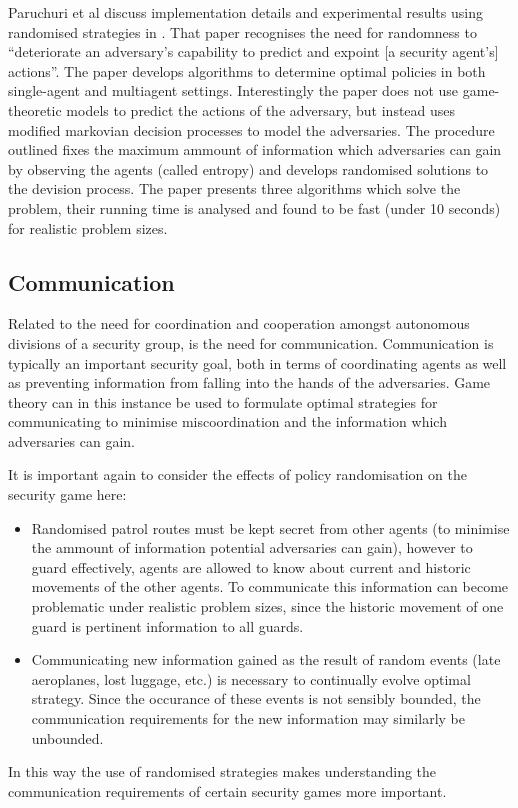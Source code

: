 \documentclass{article}
\begin{document}
Paruchuri et al discuss implementation details and experimental results using randomised strategies in \cite{xrandom}.
That paper recognises the need for randomness to ``deteriorate an adversary's capability to predict and expoint [a security agent's] actions''.
The paper develops algorithms to determine optimal policies in both single-agent and multiagent settings.
Interestingly the paper does not use game-theoretic models to predict the actions of the adversary, but instead uses modified markovian decision processes to model the adversaries.
The procedure outlined fixes the maximum ammount of information which adversaries can gain by observing the agents (called entropy) and develops randomised solutions to the devision process.
The paper presents three algorithms which solve the problem, their running time is analysed and found to be fast (under 10 seconds) for realistic problem sizes.


\subsection{Communication}

Related to the need for coordination and cooperation amongst autonomous divisions of a security group, is the need for communication.
Communication is typically an important security goal, both in terms of coordinating agents as well as preventing information from falling into the hands of the adversaries.
Game theory can in this instance be used to formulate optimal strategies for communicating to minimise miscoordination and the information which adversaries can gain.

It is important again to consider the effects of policy randomisation on the security game here:
\begin{itemize}
	\item Randomised patrol routes must be kept secret from other agents (to minimise the ammount of information potential adversaries can gain), however to guard effectively, agents are allowed to know about current and historic movements of the other agents.
			To communicate this information can become problematic under realistic problem sizes, since the historic movement of one guard is pertinent information to all guards.
	\item Communicating new information gained as the result of random events (late aeroplanes, lost luggage, etc.) is necessary to continually evolve optimal strategy.
			Since the occurance of these events is not sensibly bounded, the communication requirements for the new information may similarly be unbounded.
\end{itemize}
\noindent In this way the use of randomised strategies makes understanding the communication requirements of certain security games more important.
\end{document}
